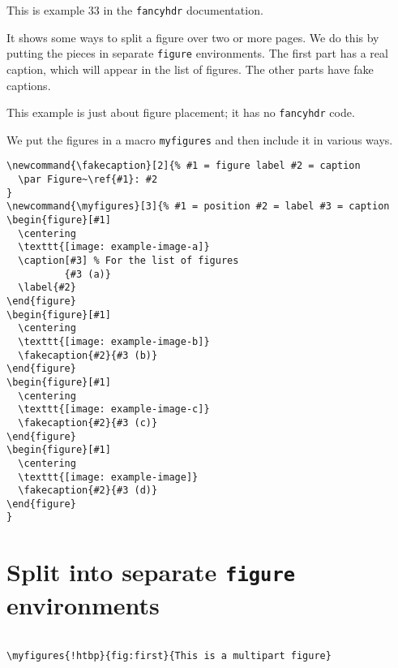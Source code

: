 \documentclass{article}
\begin{document}
\noindent
\begin{boxedminipage}{\textwidth}
This is example 33 in the \texttt{fancyhdr} documentation.

It shows some ways to split a figure over two or more pages. We do this by putting the pieces in separate \texttt{figure} environments. The first part has a real caption, which will appear in the list of figures. The other parts have fake captions.

This example is just about figure placement; it has no \texttt{fancyhdr} code.

We put the figures in a macro \texttt{myfigures} and then include it in various ways.

\begin{verbatim}
\newcommand{\fakecaption}[2]{% #1 = figure label #2 = caption
  \par Figure~\ref{#1}: #2
}
\newcommand{\myfigures}[3]{% #1 = position #2 = label #3 = caption
\begin{figure}[#1]
  \centering
  \texttt{[image: example-image-a]}
  \caption[#3] % For the list of figures
          {#3 (a)}
  \label{#2}
\end{figure}
\begin{figure}[#1]
  \centering
  \texttt{[image: example-image-b]}
  \fakecaption{#2}{#3 (b)}
\end{figure}
\begin{figure}[#1]
  \centering
  \texttt{[image: example-image-c]}
  \fakecaption{#2}{#3 (c)}
\end{figure}
\begin{figure}[#1]
  \centering
  \texttt{[image: example-image]}
  \fakecaption{#2}{#3 (d)}
\end{figure}
}
\end{verbatim}
\end{boxedminipage}

\section{Split into separate \texttt{figure} environments}

\begin{boxedminipage}{\textwidth}
\begin{verbatim}

\myfigures{!htbp}{fig:first}{This is a multipart figure}

\end{verbatim}
\end{boxedminipage}
\end{document}
